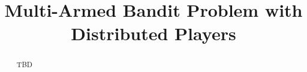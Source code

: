 \documentclass{sig-alternate}
\begin{document}



\title{Multi-Armed Bandit Problem with Distributed Players}


\maketitle

%

%

%

%

%

%

%

\begin{abstract}

TBD

\end{abstract}
\end{document}
